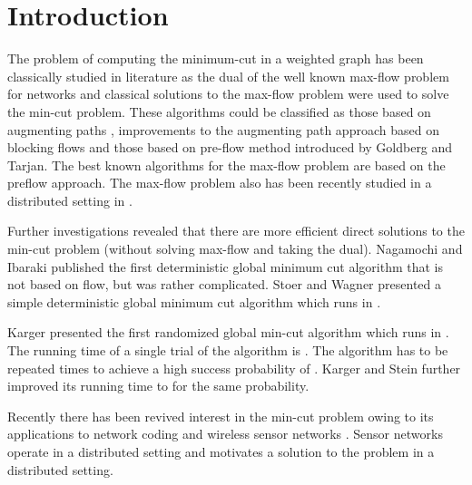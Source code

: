 \documentclass{acm_proc_article-sp}
\begin{document}

\section{Introduction}
The problem of computing the minimum-cut in a weighted graph has been
classically studied in literature
as the dual of the well known max-flow problem for networks
\cite{NRMF97} and classical solutions to the max-flow problem were used to solve the
min-cut problem. These algorithms could be classified as those based on augmenting paths
\cite{NRMF97, NRMG97}, improvements to the augmenting path
approach based on blocking flows\cite{NRMH97, NRMI97} and those based on
pre-flow method introduced by Goldberg and Tarjan\cite{NRMJ97}.  The best known algorithms for the max-flow
problem are based on the preflow approach\cite{NRMP97, NRMQ97, NRMR97}.  The max-flow
problem also has been recently studied in a distributed setting in \cite{BCDK94}.


Further investigations revealed that there are more efficient direct
solutions to the min-cut problem (without solving max-flow and taking the dual).
Nagamochi and Ibaraki\cite{NRMK97} published the first deterministic
global minimum cut algorithm that is not based on flow, but was rather
complicated. Stoer and Wagner\cite{NRML97} presented a simple
deterministic global minimum cut algorithm which runs in .


Karger\cite{NRMM97} presented the first randomized global min-cut
algorithm which runs in . The running time of a
single trial of the algorithm is . The algorithm has to
be repeated  times to achieve a high success probability
of . Karger and Stein\cite{NRMN97} further improved its
running time to  for the same probability.


Recently there has been revived interest in the min-cut problem
owing to its applications to network coding and wireless sensor networks
\cite{NRMS97, NRMT97, NRMU97}. Sensor networks operate in a
distributed setting and motivates a solution to the problem in a
distributed setting.
\end{document}
